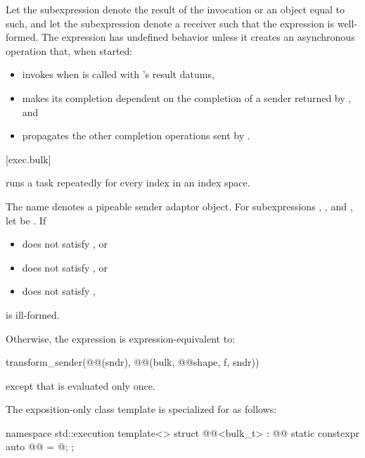 \pnum
Let the subexpression  denote
the result of the invocation  or
an object equal to such, and
let the subexpression  denote a receiver
such that the expression  is well-formed.
The expression  has undefined behavior
unless it creates an asynchronous operation that,
when started:
\begin{itemize}
\item
invokes  when  is called
with 's result datums,
\item
makes its completion dependent on
the completion of a sender returned by , and
\item
propagates the other completion operations sent by .
\end{itemize}

[exec.bulk]{}

\pnum
{} runs a task repeatedly for every index in an index space.

The name  denotes a pipeable sender adaptor object.
For subexpressions , , and ,
let  be .
If
\begin{itemize}
\item
{} does not satisfy , or
\item
{} does not satisfy , or
\item
{} does not satisfy ,
\end{itemize}
 is ill-formed.

\pnum
Otherwise,
the expression  is expression-equivalent to:

\begin{codeblock}
transform_sender(@@(sndr), @@(bulk, @@{shape, f}, sndr))
\end{codeblock}
except that  is evaluated only once.

\pnum
The exposition-only class template 
is specialized for  as follows:
\begin{codeblock}
namespace std::execution {
  template<>
  struct @@<bulk_t> : @@ {
    static constexpr auto @@ = @\seebelow@;
  };
}
\end{codeblock}

